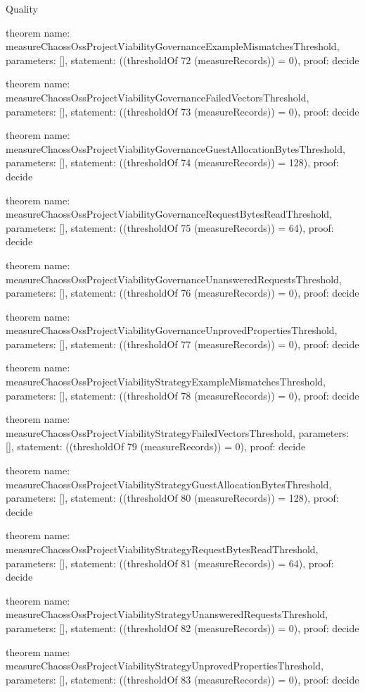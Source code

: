 \begin{lexlean}{Quality}
\begin{semanticmodule}
theorem{
  name: measureChaossOssProjectViabilityGovernanceExampleMismatchesThreshold,
  parameters: [],
  statement: ((thresholdOf 72 (measureRecords)) = 0),
  proof: decide{}
}

theorem{
  name: measureChaossOssProjectViabilityGovernanceFailedVectorsThreshold,
  parameters: [],
  statement: ((thresholdOf 73 (measureRecords)) = 0),
  proof: decide{}
}

theorem{
  name: measureChaossOssProjectViabilityGovernanceGuestAllocationBytesThreshold,
  parameters: [],
  statement: ((thresholdOf 74 (measureRecords)) = 128),
  proof: decide{}
}

theorem{
  name: measureChaossOssProjectViabilityGovernanceRequestBytesReadThreshold,
  parameters: [],
  statement: ((thresholdOf 75 (measureRecords)) = 64),
  proof: decide{}
}

theorem{
  name: measureChaossOssProjectViabilityGovernanceUnansweredRequestsThreshold,
  parameters: [],
  statement: ((thresholdOf 76 (measureRecords)) = 0),
  proof: decide{}
}

theorem{
  name: measureChaossOssProjectViabilityGovernanceUnprovedPropertiesThreshold,
  parameters: [],
  statement: ((thresholdOf 77 (measureRecords)) = 0),
  proof: decide{}
}

theorem{
  name: measureChaossOssProjectViabilityStrategyExampleMismatchesThreshold,
  parameters: [],
  statement: ((thresholdOf 78 (measureRecords)) = 0),
  proof: decide{}
}

theorem{
  name: measureChaossOssProjectViabilityStrategyFailedVectorsThreshold,
  parameters: [],
  statement: ((thresholdOf 79 (measureRecords)) = 0),
  proof: decide{}
}

theorem{
  name: measureChaossOssProjectViabilityStrategyGuestAllocationBytesThreshold,
  parameters: [],
  statement: ((thresholdOf 80 (measureRecords)) = 128),
  proof: decide{}
}

theorem{
  name: measureChaossOssProjectViabilityStrategyRequestBytesReadThreshold,
  parameters: [],
  statement: ((thresholdOf 81 (measureRecords)) = 64),
  proof: decide{}
}

theorem{
  name: measureChaossOssProjectViabilityStrategyUnansweredRequestsThreshold,
  parameters: [],
  statement: ((thresholdOf 82 (measureRecords)) = 0),
  proof: decide{}
}

theorem{
  name: measureChaossOssProjectViabilityStrategyUnprovedPropertiesThreshold,
  parameters: [],
  statement: ((thresholdOf 83 (measureRecords)) = 0),
  proof: decide{}
}


\end{semanticmodule}
\end{lexlean}
